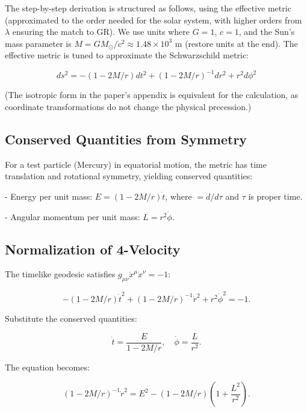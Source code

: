 \documentclass{article}
\begin{document}
The step-by-step derivation is structured as follows, using the effective metric (approximated to the order needed for the solar system, with higher orders from \(\lambda\) ensuring the match to GR). We use units where \(G = 1\), \(c = 1\), and the Sun's mass parameter is \(M = GM_\odot / c^2 \approx 1.48 \times 10^3\) m (restore units at the end). The effective metric is tuned to approximate the Schwarzschild metric:

\begin{equation}
ds^2 = - (1 - 2M/r) dt^2 + (1 - 2M/r)^{-1} dr^2 + r^2 d\phi^2
\end{equation}

(The isotropic form in the paper's appendix is equivalent for the calculation, as coordinate transformations do not change the physical precession.)

\subsection{Conserved Quantities from Symmetry}

For a test particle (Mercury) in equatorial motion, the metric has time translation and rotational symmetry, yielding conserved quantities:

- Energy per unit mass: \( E = (1 - 2M/r) \dot{t} \), where \(\dot{} = d/d\tau\) and \(\tau\) is proper time.

- Angular momentum per unit mass: \( L = r^2 \dot{\phi}\).

\subsection{Normalization of 4-Velocity}

The timelike geodesic satisfies \(g_{\mu\nu} \dot{x}^\mu \dot{x}^\nu = -1\):

\begin{equation}
 - (1 - 2M/r) \dot{t}^2 + (1 - 2M/r)^{-1} \dot{r}^2 + r^2 \dot{\phi}^2 = -1.
\end{equation}

Substitute the conserved quantities:

\begin{equation}
\dot{t} = \frac{E}{1 - 2M/r}, \quad \dot{\phi} = \frac{L}{r^2}.
\end{equation}

The equation becomes:

\begin{equation}
 (1 - 2M/r)^{-1} \dot{r}^2 = E^2 - (1 - 2M/r) \left(1 + \frac{L^2}{r^2}\right).
\end{equation}
\end{document}
